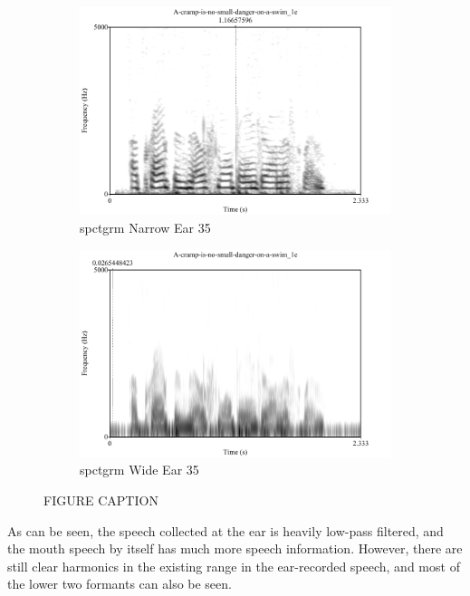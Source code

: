 \documentclass[dissertation,copyright]{uathesis}
\begin{document}
\begin{figure}
\centering
\begin{subfigure}{0.5\textwidth}
  \centering
  \includegraphics[width=1\linewidth]{figure/spctgrmNarrowEar_35.pdf}
  \caption{spctgrm Narrow Ear 35}
  \label{spctgrmNarrowEar_35}
\end{subfigure}%
\hfill
\begin{subfigure}{0.5\textwidth}
  \centering
  \includegraphics[width=1\linewidth]{figure/spctgrmWideEar_35.pdf}
  \caption{spctgrm Wide Ear 35}
  \label{spctgrmWideEar_35}
\end{subfigure}
\caption{FIGURE CAPTION}
\label{fig:spect_ear}
\end{figure}


As can be seen, the speech collected at the ear is heavily low-pass filtered, and the mouth speech by itself has much more speech information.
However, there are still clear harmonics in the existing range in the ear-recorded speech, and most of the lower two formants can also be seen.
\end{document}
